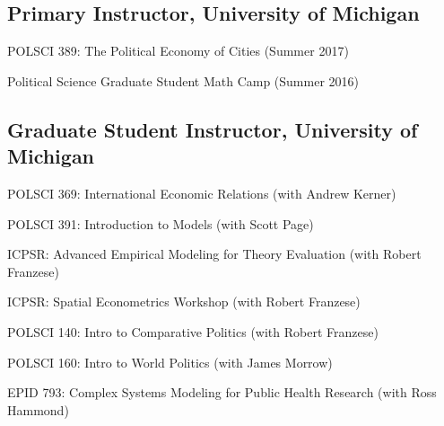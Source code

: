 \documentclass[letterpaper]{article}
\renewenvironment{itemize}{
  \begin{list}{}{
    \setlength{\leftmargin}{1.5em}
  }
}{
  \end{list}
}
\begin{document}
\subsection*{Primary Instructor, University of Michigan}
\begin{itemize}
\item POLSCI 389: The Political Economy of Cities  (Summer 2017)
\item Political Science Graduate Student Math Camp (Summer 2016)
\end{itemize}

\subsection*{Graduate Student Instructor, University of Michigan}
\begin{itemize}
\item POLSCI 369: International Economic Relations (with Andrew Kerner) %
\item POLSCI 391: Introduction to Models (with Scott Page) %
\item ICPSR: Advanced Empirical Modeling for Theory Evaluation (with Robert Franzese) %
\item ICPSR: Spatial Econometrics Workshop (with Robert Franzese) %
\item POLSCI 140: Intro to Comparative Politics (with Robert Franzese) %
\item POLSCI 160: Intro to World Politics (with James Morrow) %
\item EPID 793: Complex Systems Modeling for Public Health Research (with Ross Hammond) %
\end{itemize}
\end{document}
